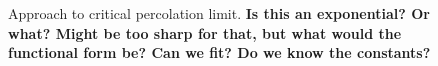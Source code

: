 \documentclass[12pt]{article} \usepackage{simplemargins}
\begin{document}

\begin{figure}
\caption{Approach to critical percolation limit. {\bf Is this an
    exponential?  Or what?  Might be too sharp for that, but what
    would the functional form be? Can we fit?  Do we know the constants?}}
\end{figure}
\end{document}
